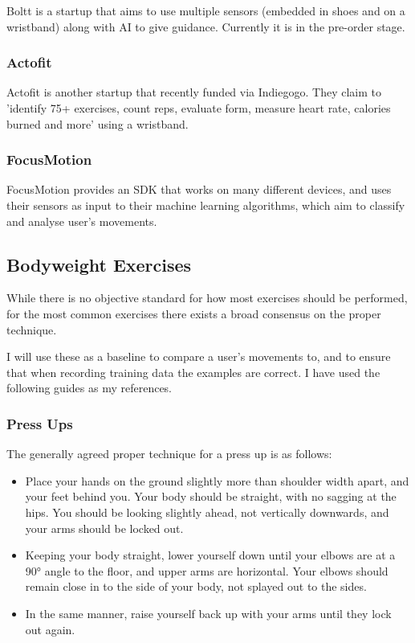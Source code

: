 \documentclass[a4paper]{article}
\begin{document}
Boltt\cite{bgref12} is a startup that aims to use multiple sensors (embedded in shoes and on a wristband) along with AI to give guidance. Currently it is in the pre-order stage.

\subsubsection{Actofit}

Actofit\cite{bgref13} is another startup that recently funded via Indiegogo\cite{bgref14}. They claim to 'identify 75+ exercises, count reps, evaluate form, measure heart rate, calories burned and more' using a wristband.

\subsubsection{FocusMotion}

FocusMotion\cite{bgref15} provides an SDK that works on many different devices, and uses their sensors as input to their machine learning algorithms, which aim to classify and analyse user's movements.

\subsection{Bodyweight Exercises}%

While there is no objective standard for how most exercises should be performed, for the most common exercises there exists a broad consensus on the proper technique.

I will use these as a baseline to compare a user's movements to, and to ensure that when recording training data the examples are correct. I have used the following guides as my references.

\subsubsection{Press Ups}

The generally agreed proper technique for a press up is as follows:

\begin{itemize}
    \item Place your hands on the ground slightly more than shoulder width apart, and your feet behind you. Your body should be straight, with no sagging at the hips. You should be looking slightly ahead, not vertically downwards, and your arms should be locked out.
    \item Keeping your body straight, lower yourself down until your elbows are at a 90° angle to the floor, and upper arms are horizontal. Your elbows should remain close in to the side of your body, not splayed out to the sides.
    \item In the same manner, raise yourself back up with your arms until they lock out again.
\end{itemize}
\end{document}

